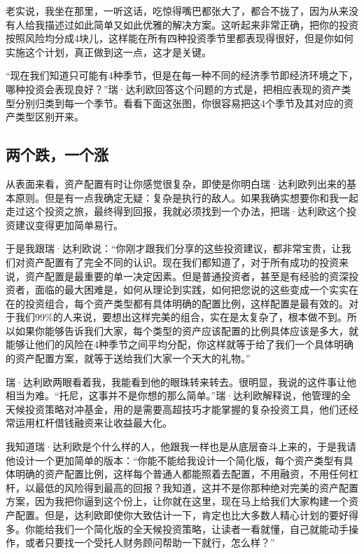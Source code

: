 老实说，我坐在那里，一听这话，吃惊得嘴巴都张大了，都合不拢了，因为从来没有人给我描述过如此简单又如此优雅的解决方案。这听起来非常正确，把你的投资按照风险均分成4块儿，这样能在所有四种投资季节里都表现得很好，但是你如何实施这个计划，真正做到这一点，这才是关键。

“现在我们知道只可能有4种季节，但是在每一种不同的经济季节即经济环境之下，哪种投资会表现良好？”瑞·达利欧回答这个问题的方式是，把相应表现的资产类型分别归类到每一个季节。看看下面这张图，你很容易把这4个季节及其对应的资产类型区别开来。



\subsection{两个跌，一个涨}

从表面来看，资产配置有时让你感觉很复杂，即使是你明白瑞·达利欧列出来的基本原则。但是有一点我确定无疑：复杂是执行的敌人。如果我确实想要你和我一起走过这个投资之旅，最终得到回报，我就必须找到一个办法，把瑞·达利欧这个投资建议变得更加简单易行。

于是我跟瑞·达利欧说：“你刚才跟我们分享的这些投资建议，都非常宝贵，让我们对资产配置有了完全不同的认识。现在我们都知道了，对于所有成功的投资来说，资产配置是最重要的单一决定因素。但是普通投资者，甚至是有经验的资深投资者，面临的最大困难是，如何从理论到实践，如何把您说的这些变成一个实实在在的投资组合，每个资产类型都有具体明确的配置比例，这样配置是最有效的。对于我们99\%的人来说，要想出这样完美的组合，实在是太复杂了，根本做不到。所以如果你能够告诉我们大家，每个类型的资产应该配置的比例具体应该是多大，就能够让他们的风险在4种季节之间平均分配，你这样就等于给了我们一个具体明确的资产配置方案，就等于送给我们大家一个天大的礼物。”

瑞·达利欧两眼看着我，我能看到他的眼珠转来转去。很明显，我说的这件事让他相当为难。“托尼，这事并不是你想的那么简单。”瑞·达利欧解释说，他管理的全天候投资策略对冲基金，用的是需要高超技巧才能掌握的复杂投资工具，他们还经常运用杠杆借钱融资来让收益最大化。

我知道瑞·达利欧是个什么样的人，他跟我一样也是从底层奋斗上来的，于是我请他设计一个更加简单的版本：“你能不能给我设计一个简化版，每个资产类型有具体明确的资产配置比例，这样每个普通人都能照着去配置，不用融资，不用任何杠杆，以最低的风险得到最高的回报？我知道，这并不是你那种绝对完美的资产配置方案，因为我把你逼到这个份上，让你就在这里，现在马上给我们大家构建一个资产配置。但是，达利欧即使你大致估计一下，肯定也比大多数人精心计划的要好得多。你能给我们一个简化版的全天候投资策略，让读者一看就懂，自己就能动手操作，或者只要找一个受托人财务顾问帮助一下就行，怎么样？”

